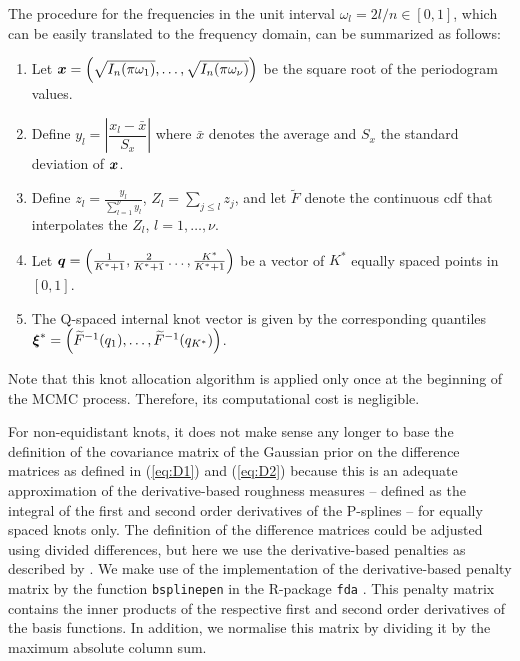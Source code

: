 \documentclass[twocolumn,final]{svjour3}
\newcommand{\bm}[1]{\mbox{\boldmath $#1$}}
\newcommand{\pmr}{ \color{red}}
\begin{document}
{\pmr
The procedure for the frequencies in the unit interval $\omega_l = 2 l/n  \in[0,1]$, which can be easily translated to the frequency domain, can be summarized as follows:	
\begin{enumerate}
	\item Let $\bm{x} = \left (\sqrt{I_n(\pi\omega_1)}, \dots, \sqrt{I_n(\pi\omega_{\nu})} \right)$ be the square root of the periodogram values.
	\item Define $y_l = \left|\dfrac{x_l - \bar{x}}{S_x} \right|$ where $\bar{x}$ denotes the average and $S_x$ the standard deviation of ${\bm x}$.
	\item Define $z_l = \frac{y_l}{\sum_{l=1}^{\nu} y_l}$, $Z_l= \sum_{j\leq l} z_j$, and let $\widetilde{F}$ denote the continuous cdf that interpolates the $Z_l$, $l=1,\ldots,\nu$.
	\item Let $\bm{q} =\left( \frac{1}{K^*+1}, \frac{2}{K^*+1}\dots, \frac{K^*}{K^*+1} \right)$ be a vector of $K^*$ equally spaced points  in  $[0,1]$.
	\item The Q-spaced internal knot vector is given by the corresponding quantiles $\bm{\xi}^* = \left(\widetilde{F}^{-1}(q_1),\dots, \widetilde{F}^{-1}(q_{K^*}) \right)$. %
\end{enumerate}

Note that this knot allocation algorithm is applied only once at the beginning of the MCMC process.  Therefore, its computational cost is negligible.

}

For non-equidistant knots, it does not make sense any longer to base the definition of the covariance matrix of the Gaussian prior  on the  difference matrices as defined in (\ref{eq:D1}) and (\ref{eq:D2}) because this is an adequate approximation of the derivative-based roughness measures -- defined as the integral of the first and second order derivatives of the P-splines -- 
for equally spaced knots only. The definition of the difference matrices could be adjusted using divided differences, but here we use the derivative-based penalties as described by \cite{WoodSimon2017Pwdb}. We make use of the implementation of the derivative-based penalty matrix  by the function {\tt bsplinepen} in the R-package {\tt fda} \citep{fda}. This penalty matrix contains the inner products of the respective first and second order derivatives of the basis functions. In addition, we normalise this matrix by dividing it by the maximum absolute column sum.
\end{document}

